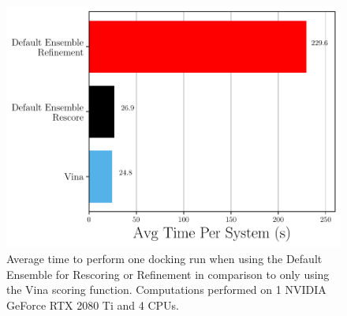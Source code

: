 \documentclass[journal=jcisd8,manuscript=article]{achemso}
\begin{document}
\begin{figure}
    \centering
    \includegraphics{figures/other/refine_timing_comparison.pdf}
    \caption{Average time to perform one docking run when using the Default Ensemble for Rescoring or Refinement in comparison to only using the Vina scoring function. Computations performed on 1 NVIDIA GeForce RTX 2080 Ti and 4 CPUs.}
    \label{fig:RefineTiming}
\end{figure}
\end{document}
